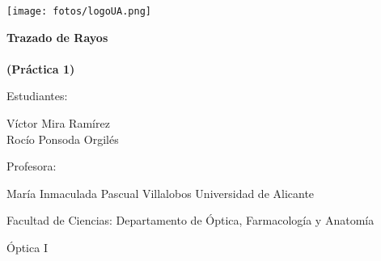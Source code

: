 \documentclass[11pt]{article}
\newcommand{\titulo}{Trazado de Rayos \\\ \\(Práctica 1)}
\newcommand{\nombreestudiante}{Víctor Mira Ramírez\\ Rocío Ponsoda Orgilés}
\newcommand{\nombredirector}{María Inmaculada Pascual Villalobos}
\newcommand{\fecha}{\date{Noviembre 2023}}
\begin{document}
\begin{titlepage}
	\centering
	\texttt{[image: fotos/logoUA.png]}\par
	\vspace{1cm}
	{\huge\bfseries \vspace{15mm} \titulo \par}
	\vfill
	{\large 
	\vfill
	Estudiantes:\par\vspace{2mm}
	\nombreestudiante\par
	\vfill
	Profesora:\par\vspace{2mm}
    \nombredirector
    \vfill
    Universidad de Alicante\par
    Facultad de Ciencias: Departamento de Óptica, Farmacología y Anatomía\par
    Óptica I\par
	\fecha\par}
\end{titlepage}

\pagebreak

\begin{abstract}\label{sec:abstract}


    \noindent En esta práctica, nos sumergimos en la compleja tarea de visualizar y dar significado al trazado de rayos, ya sean paraxiales o exactos, a medida que atraviesan distintos sistemas ópticos. Al mismo tiempo, exploramos la disposición de los elementos cardinales en estos sistemas, así como diversas manifestaciones de aberraciones ópticas. Durante la sesión práctica, nos sumergimos en conceptos teóricos utilizando la plataforma UB Optics como medio conductor. Esta metodología no solo sirvió para confirmar los conocimientos teóricos adquiridos, sino también para aplicarlos de manera práctica en la simulación de instrumentos.
\end{abstract}
\end{document}
